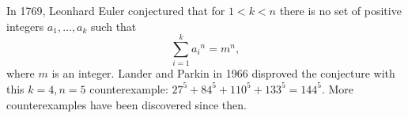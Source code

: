 \documentclass[12pt]{article}
\begin{document}
In 1769, Leonhard Euler conjectured that for $1 < k < n$ there is no set of positive integers $a_1, \ldots, a_k$ such that $$\sum_{i = 1}^k {a_i}^n = m^n,$$ where $m$ is an integer. Lander and Parkin in 1966 disproved the conjecture with this $k = 4, n = 5$ counterexample: $27^5 + 84^5 + 110^5 + 133^5 = 144^5$. More counterexamples have been discovered since then.
\end{document}
